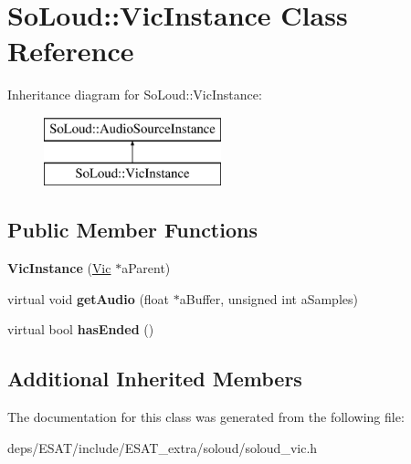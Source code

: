 \hypertarget{class_so_loud_1_1_vic_instance}{}\section{So\+Loud\+:\+:Vic\+Instance Class Reference}
\label{class_so_loud_1_1_vic_instance}
Inheritance diagram for So\+Loud\+:\+:Vic\+Instance\+:\begin{figure}[H]
\begin{center}
\leavevmode
\includegraphics[height=2.000000cm]{class_so_loud_1_1_vic_instance}
\end{center}
\end{figure}
\subsection*{Public Member Functions}
\begin{DoxyCompactItemize}
\item 
\mbox{\label{class_so_loud_1_1_vic_instance_ab6ed565589e8f62e1c05cccceb78cbb6}} 
{\bfseries Vic\+Instance} (\mbox{\hyperlink{class_so_loud_1_1_vic}{Vic}} $\ast$a\+Parent)
\item 
\mbox{\label{class_so_loud_1_1_vic_instance_a00489f71809080eb25790aa4a9dfbd64}} 
virtual void {\bfseries get\+Audio} (float $\ast$a\+Buffer, unsigned int a\+Samples)
\item 
\mbox{\label{class_so_loud_1_1_vic_instance_adf8b06e6a2628e69823b3d31d94245e5}} 
virtual bool {\bfseries has\+Ended} ()
\end{DoxyCompactItemize}
\subsection*{Additional Inherited Members}


The documentation for this class was generated from the following file\+:\begin{DoxyCompactItemize}
\item 
deps/\+E\+S\+A\+T/include/\+E\+S\+A\+T\+\_\+extra/soloud/soloud\+\_\+vic.\+h\end{DoxyCompactItemize}
